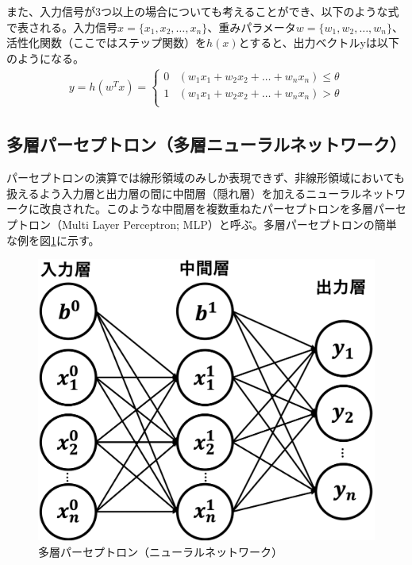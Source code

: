 また、入力信号が3つ以上の場合についても考えることができ、以下のような式で表される。入力信号$x = \{ x_1, x_2, \ldots, x_n \}$、重みパラメータ$w = \{ w_1, w_2, \ldots, w_n \}$、活性化関数（ここではステップ関数）を$h(x)$とすると、出力ベクトルyは以下のようになる。
\begin{align}
y = h(w^T x) =
 \begin{cases}
 0 & (w_1x_1 + w_2x_2 + \ldots + w_nx_n) \leq \theta\\
 1 & (w_1x_1 + w_2x_2 + \ldots + w_nx_n) > \theta \\
 \end{cases}
\end{align}
\subsection{多層パーセプトロン（多層ニューラルネットワーク）}
パーセプトロンの演算では線形領域のみしか表現できず、非線形領域においても扱えるよう入力層と出力層の間に中間層（隠れ層）を加えるニューラルネットワークに改良された。このような中間層を複数重ねたパーセプトロンを多層パーセプトロン（Multi Layer Perceptron; MLP）と呼ぶ。多層パーセプトロンの簡単な例を図\ref{mlp}に示す。\\
\begin{figure}[H]
	\begin{center}
 \includegraphics[keepaspectratio, scale=0.2]
 	{Figure/Deeplearning/mlp.png}
 		\caption{多層パーセプトロン（ニューラルネットワーク）}
 		\label{mlp}
	\end{center}
\end{figure}
